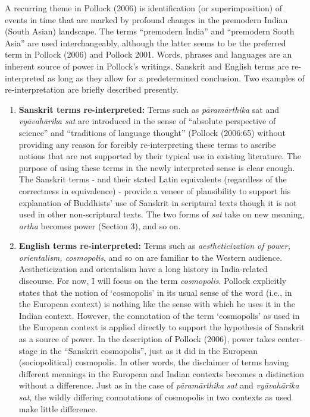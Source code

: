 A recurring theme in Pollock (2006) is identification (or superimposition) of events in time that are marked by profound changes in the premodern Indian (South Asian) landscape. The terms “premodern India” and “premodern South Asia” are used interchangeably, although the latter seems to be the preferred term in Pollock (2006) and Pollock 2001. Words, phrases and languages are an inherent source of power in Pollock’s writings. Sanskrit and English terms are re-interpreted as long as they allow for a predetermined conclusion. Two examples of re-interpretation are briefly described presently. 

\begin{enumerate}
\item {\bf Sanskrit terms re-interpreted:} Terms such as {\sl pāramārthika} sat and {\sl vyāvahārika sat} are introduced in the sense of “absolute perspective of science” and “traditions of language thought” (Pollock (2006:65) without providing any reason for forcibly re-interpreting these terms to ascribe notions that are not supported by their typical use in existing literature. The purpose of using these terms in the newly interpreted sense is clear enough. The Sanskrit terms - and their stated Latin equivalents (regardless of the correctness in equivalence) - provide a veneer of plausibility to support his explanation of Buddhists’ use of Sanskrit in scriptural texts though it is not used in other non-scriptural texts. The two forms of {\sl sat} take on new meaning, {\sl artha} becomes power (Section 3), and so on.


\item {\bf English terms re-interpreted:} Terms such as {\sl aestheticization of power, orientalism, cosmopolis}, and so on are familiar to the Western audience. Aestheticization and orientalism have a long history in India-related discourse. For now, I will focus on the term {\sl cosmopolis}. Pollock explicitly states that the notion of ‘cosmopolis’ in its usual sense of the word (i.e., in the European context) is nothing like the sense with which he uses it in the Indian context. However, the connotation of the term ‘cosmopolis’ as used in the European context is applied directly to support the hypothesis of Sanskrit as a source of power. In the description of Pollock (2006), power takes center-stage in the “Sanskrit cosmopolis”, just as it did in the European (sociopolitical) cosmopolis. In other words, the disclaimer of terms having different meanings in the European and Indian contexts becomes a distinction without a difference. Just as in the case of {\sl pāramārthika sat} and {\sl vyāvahārika sat}, the wildly differing connotations of cosmopolis in two contexts as used make little difference.
\end{enumerate}

